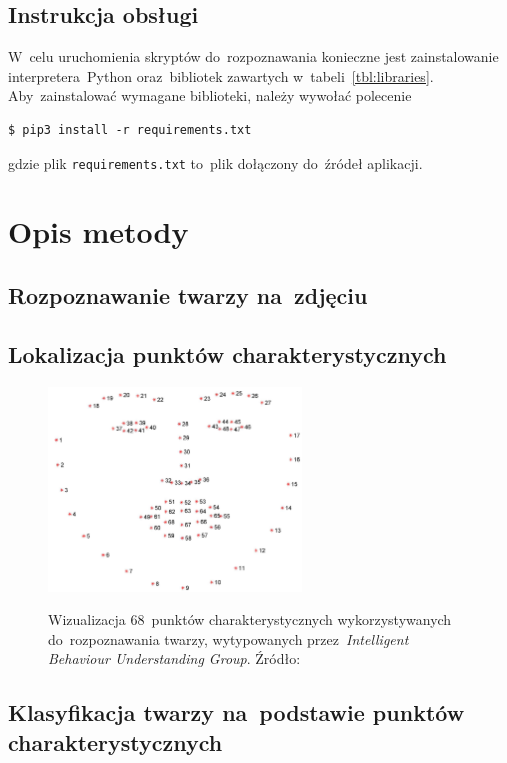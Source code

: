 \documentclass[11pt,a4paper]{article}
\begin{document}
\subsection{Instrukcja obsługi}
\label{sec:manual}

W~celu uruchomienia skryptów do~rozpoznawania konieczne jest zainstalowanie interpretera~Python oraz~bibliotek zawartych w~tabeli~\ref{tbl:libraries}.
Aby~zainstalować wymagane biblioteki, należy wywołać polecenie
\begin{verbatim}
$ pip3 install -r requirements.txt
\end{verbatim}
gdzie plik \texttt{requirements.txt} to~plik dołączony do~źródeł aplikacji.

\section{Opis metody}

\subsection{Rozpoznawanie twarzy na~zdjęciu}

\subsection{Lokalizacja punktów charakterystycznych}

\begin{figure}[H]
    \centering
    \includegraphics[width=0.6\textwidth]{res/img/figure_68_markup.jpg}
    \label{fig:68-landmarks}
    \caption{Wizualizacja 68~punktów charakterystycznych wykorzystywanych do~rozpoznawania twarzy, wytypowanych przez~\emph{Intelligent Behaviour Understanding Group}. Źródło: \cite{sagonas2013}}
\end{figure}

\subsection{Klasyfikacja twarzy na~podstawie punktów charakterystycznych}
\end{document}
